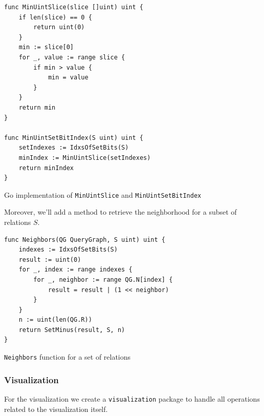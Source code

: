\begin{algorithm}[H]
\begin{verbatim}
func MinUintSlice(slice []uint) uint {
    if len(slice) == 0 {
        return uint(0)
    }
    min := slice[0]
    for _, value := range slice {
        if min > value {
            min = value
        }
    }
    return min
}

func MinUintSetBitIndex(S uint) uint {
	setIndexes := IdxsOfSetBits(S)
	minIndex := MinUintSlice(setIndexes)
	return minIndex
}
\end{verbatim}
\caption{Go implementation of \texttt{MinUintSlice} and \texttt{MinUintSetBitIndex}}
\label{alg:implementation-minuintslice}
\end{algorithm}
\vspace{0.5cm}


Moreover, we'll add a method to retrieve the neighborhood for a subset of relations $S$.

\begin{algorithm}[H]
\begin{verbatim}
func Neighbors(QG QueryGraph, S uint) uint {
    indexes := IdxsOfSetBits(S)
    result := uint(0)
    for _, index := range indexes {
        for _, neighbor := range QG.N[index] {
            result = result | (1 << neighbor)
        }
    }
    n := uint(len(QG.R))
    return SetMinus(result, S, n)
}
\end{verbatim}
\caption{\texttt{Neighbors} function for a set of relations}
\end{algorithm}
\vspace{0.5cm}

\subsubsection{Visualization}
\label{subsub:implementation-visualization}

For the visualization we create a \texttt{visualization} package to handle all operations related to the visualization itself. 

